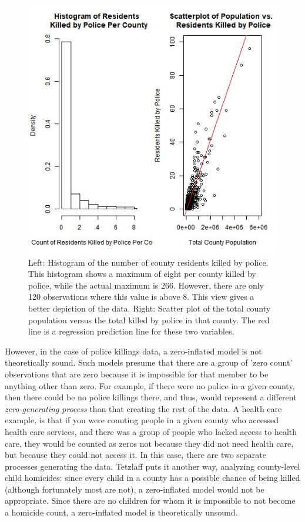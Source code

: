 \documentclass[sigconf]{acmart}
\begin{document}
\begin{figure}
\includegraphics[width=1.0\textwidth]{images/figure2.jpg}
\caption{Left: Histogram of the number of county residents killed by police.  This histogram shows a maximum of eight per county killed by police, while the actual maximum is 266.  However, there are only 120 observations where this value is above 8.  This view gives a better depiction of the data.  Right: Scatter plot of the total county population versus the total killed by police in that county.  The red line is a regression prediction line for these two variables.}
\end{figure}

However, in the case of police killings data, a zero-inflated model is not theoretically sound.  Such models presume that there are a group of 'zero count' observations that are zero because it is impossible for that member to be anything other than zero.  For example, if there were no police in a given county, then there could be no police killings there, and thus, would represent a different {\em zero-generating process} than that creating the rest of the data. \cite{min02,feng16,neelon16} A health care example, is that if you were counting people in a given county who accessed health care services, and there was a group of people who lacked access to health care, they would be counted as zeros not because they did not need health care, but because they could not access it. In this case, there are two separate processes generating the data. \cite{neelon16} Tetzlaff puts it another way, analyzing county-level child homicides: since every child in a county has a possible chance of being killed (although fortunately most are not), a zero-inflated model would not be appropriate. Since there are no children for whom it is impossible to not become a homicide count, a zero-inflated model is theoretically unsound. \cite{tetzlaff13}
\end{document}
